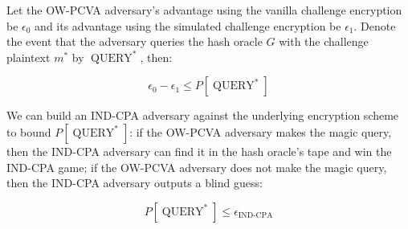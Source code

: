 \documentclass{article}
\begin{document}
Let the OW-PCVA adversary's advantage using the vanilla challenge encryption be $\epsilon_0$ and its advantage using the simulated challenge encryption be $\epsilon_1$. Denote the event that the adversary queries the hash oracle $G$ with the challenge plaintext $m^\ast$ by $\operatorname{QUERY}^\ast$, then:

\begin{equation*}
    \epsilon_0 - \epsilon_1 \leq P[\operatorname{QUERY}^\ast]
\end{equation*}

We can build an IND-CPA adversary against the underlying encryption scheme to bound $P[\operatorname{QUERY}^\ast]$: if the OW-PCVA adversary makes the magic query, then the IND-CPA adversary can find it in the hash oracle's tape and win the IND-CPA game; if the OW-PCVA adversary does not make the magic query, then the IND-CPA adversary outputs a blind guess:

\begin{equation*}
    P[\operatorname{QUERY}^\ast] \leq \epsilon_\text{IND-CPA}
\end{equation*}
\end{document}

